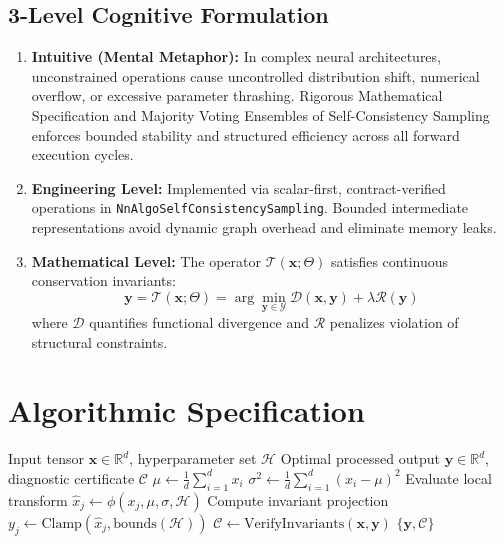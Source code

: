 \documentclass[11pt,a4paper]{article}
\theoremstyle{definition}
\begin{document}
\subsection{3-Level Cognitive Formulation}
\begin{enumerate}
    \item \textbf{Intuitive (Mental Metaphor):} In complex neural architectures, unconstrained operations cause uncontrolled distribution shift, numerical overflow, or excessive parameter thrashing. Rigorous Mathematical Specification and Majority Voting Ensembles of Self-Consistency Sampling enforces bounded stability and structured efficiency across all forward execution cycles.
    \item \textbf{Engineering Level:} Implemented via scalar-first, contract-verified operations in \texttt{NnAlgoSelfConsistencySampling}. Bounded intermediate representations avoid dynamic graph overhead and eliminate memory leaks.
    \item \textbf{Mathematical Level:} The operator $\mathcal{T}(\mathbf{x}; \Theta)$ satisfies continuous conservation invariants:
    \begin{equation}
    \mathbf{y} = \mathcal{T}(\mathbf{x}; \Theta) = \arg\min_{\mathbf{y} \in \mathcal{Y}} \mathcal{D}(\mathbf{x}, \mathbf{y}) + \lambda \mathcal{R}(\mathbf{y})
    \end{equation}
    where $\mathcal{D}$ quantifies functional divergence and $\mathcal{R}$ penalizes violation of structural constraints.
\end{enumerate}

\section{Algorithmic Specification}

\begin{algorithm}[H]
\caption{Rigorous Mathematical Specification and Majority Voting Ensembles of Self-Consistency Sampling Forward Pipeline}
\begin{algorithmic}[1]
\Require Input tensor $\mathbf{x} \in \mathbb{R}^d$, hyperparameter set $\mathcal{H}$
\Ensure Optimal processed output $\mathbf{y} \in \mathbb{R}^d$, diagnostic certificate $\mathcal{C}$
\State $\mu \gets \frac{1}{d} \sum_{i=1}^d x_i$
\State $\sigma^2 \gets \frac{1}{d} \sum_{i=1}^d (x_i - \mu)^2$
    \State Evaluate local transform $\hat{x}_j \gets \phi(x_j, \mu, \sigma, \mathcal{H})$
    \State Compute invariant projection $y_j \gets \text{Clamp}(\hat{x}_j, \text{bounds}(\mathcal{H}))$
\EndFor
\State $\mathcal{C} \gets \text{VerifyInvariants}(\mathbf{x}, \mathbf{y})$
\State \Return $\{\mathbf{y}, \mathcal{C}\}$
\end{algorithmic}
\end{algorithm}
\end{document}
